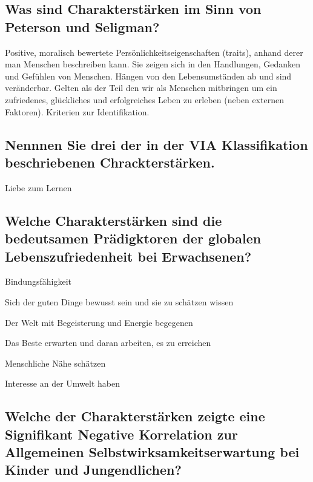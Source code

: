 \documentclass[a6paper,9pt,DIV=14]{scrartcl}
\begin{document}
\subsection{Was sind Charakterstärken im Sinn von Peterson und Seligman?} %
Positive, moralisch bewertete Persönlichkeitseigenschaften (traits), anhand derer man Menschen beschreiben kann. Sie zeigen sich in den Handlungen, Gedanken und Gefühlen von Menschen. Hängen von den Lebensumständen ab und sind veränderbar. Gelten als der Teil den wir als Menschen mitbringen um ein zufriedenes, glückliches und erfolgreiches Leben zu erleben (neben externen Faktoren). Kriterien zur Identifikation.
\subsection{Nennnen Sie drei der in der VIA Klassifikation beschriebenen Chrackterstärken.} %
\begin{labeling}{Liebe zum Lernen}
\item [Neugier]
\item [Liebe zum Lernen]
\item [Tapferkeit]
\end{labeling}
\subsection{Welche Charakterstärken sind die bedeutsamen Prädigktoren der globalen Lebenszufriedenheit bei Erwachsenen?}
\begin{labeling}{Bindungsfähigkeit}
\item [Dankbarkeit] Sich der guten Dinge bewusst sein und sie zu schätzen wissen
\item [Tatendrang] Der Welt mit Begeisterung und Energie begegenen
\item [Hoffnung] Das Beste erwarten und daran arbeiten, es zu erreichen
\item [Bindungsfähigkeit] Menschliche Nähe schätzen
\item [Neugier] Interesse an der Umwelt haben
\end{labeling}
\subsection{Welche der Charakterstärken zeigte eine Signifikant Negative Korrelation zur Allgemeinen Selbstwirksamkeitserwartung bei Kinder und Jungendlichen?} %
\end{document}
